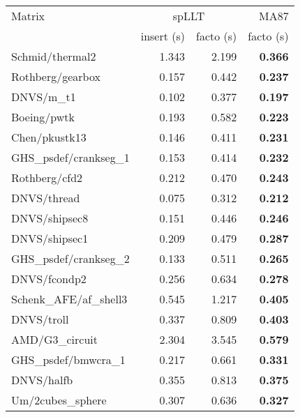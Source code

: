\begin{tabular}{l|rr|r}
  \hline
  Matrix                          & \multicolumn{2}{c}{spLLT} & MA87                   \\
  \cline{2-4}
                                  & insert (s)                & facto (s) & facto (s)  \\
  \hline
  Schmid/thermal2                 & 1.343                     & 2.199     & \bf 0.366  \\
  Rothberg/gearbox                & 0.157                     & 0.442     & \bf 0.237  \\
  DNVS/m\_t1                      & 0.102                     & 0.377     & \bf 0.197  \\
  Boeing/pwtk                     & 0.193                     & 0.582     & \bf 0.223  \\
  Chen/pkustk13                   & 0.146                     & 0.411     & \bf 0.231  \\
  GHS\_psdef/crankseg\_1          & 0.153                     & 0.414     & \bf 0.232  \\
  Rothberg/cfd2                   & 0.212                     & 0.470     & \bf 0.243  \\
  DNVS/thread                     & 0.075                     & 0.312     & \bf 0.212  \\
  DNVS/shipsec8                   & 0.151                     & 0.446     & \bf 0.246  \\
  DNVS/shipsec1                   & 0.209                     & 0.479     & \bf 0.287  \\
  GHS\_psdef/crankseg\_2          & 0.133                     & 0.511     & \bf 0.265  \\
  DNVS/fcondp2                    & 0.256                     & 0.634     & \bf 0.278  \\
  Schenk\_AFE/af\_shell3          & 0.545                     & 1.217     & \bf 0.405  \\
  DNVS/troll                      & 0.337                     & 0.809     & \bf 0.403  \\
  AMD/G3\_circuit                 & 2.304                     & 3.545     & \bf 0.579  \\
  GHS\_psdef/bmwcra\_1            & 0.217                     & 0.661     & \bf 0.331  \\
  DNVS/halfb                      & 0.355                     & 0.813     & \bf 0.375  \\
  Um/2cubes\_sphere               & 0.307                     & 0.636     & \bf 0.327  \\

\end{tabular}
